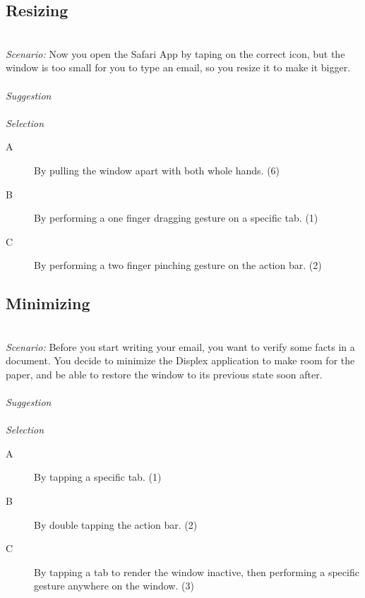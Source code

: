 \subsection{Resizing}
\hfill\\
\emph{Scenario:}
Now you open the Safari App by taping on the correct icon, but the window is too small for you to type an email, so you resize it to make it bigger.
\\\\
\emph{Suggestion}
\\\\
\emph{Selection}
\begin{description}
\item[A]{By pulling the window apart with both whole hands. (6)}
\item[B]{By performing a one finger dragging gesture on a specific tab. (1)}
\item[C]{By performing a two finger pinching gesture on the action bar. (2)}
\end{description}



\subsection{Minimizing}
\hfill\\
\emph{Scenario:}
Before you start writing your email, you want to verify some facts in a document.
You decide to minimize the Displex application to make room for the paper, and be able to restore the window to its previous state soon after.
\\\\
\emph{Suggestion}
\\\\
\emph{Selection}
\begin{description}
\item[A]{By tapping a specific tab. (1)}
\item[B]{By double tapping the action bar. (2)}
\item[C]{By tapping a tab to render the window inactive, then performing a specific gesture anywhere on the window. (3)}
\end{description}


